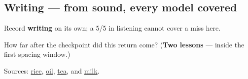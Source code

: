 \subsection*{Writing — from sound, every model covered}
Record \textbf{writing} on its own; a 5/5 in listening cannot cover a miss here.

\begin{tcolorbox}[breakable,colback=teal!4,colframe=teal!35!black,title={Before you move on}]
How far after the checkpoint did this return come? (\textbf{Two lessons} — inside the first spacing window.)

Sources: \href{https://dictionary.cambridge.org/dictionary/english-gujarati/rice}{rice}, \href{https://dictionary.cambridge.org/dictionary/english-gujarati/oil}{oil}, \href{https://dictionary.cambridge.org/dictionary/english-gujarati/tea}{tea}, and \href{https://dictionary.cambridge.org/dictionary/english-gujarati/milk}{milk}.
\end{tcolorbox}
